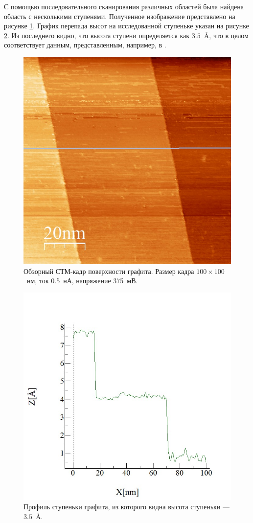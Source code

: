 \documentclass[a4paper, 12pt]{article}
\begin{document}
	С помощью последовательного сканирования различных областей была найдена область с несколькими ступенями. Полученное изображение представлено на рисунке \ref{fig:2_step}. График перепада высот на исследованной ступеньке указан на рисунке \ref{fig:2_step_anal}. Из последнего видно, что высота ступени определяется как $3.5$~\AA, что в целом соответствует данным, представленным, например, в \cite{Article}.
	
	\begin{figure}[H]
		\centering
		\includegraphics[width=0.58\linewidth]{../STM_data/Step/Step_final}
		\caption{Обзорный СТМ-кадр поверхности графита. Размер кадра $100\times100$~нм, ток 0.5~нА, напряжение 375~мВ.}
		\label{fig:2_step}
	\end{figure}
	
	\begin{figure}[H]
		\centering
		\includegraphics[width=0.6\linewidth]{../STM_data/Step/Step_final_Graph_enh.jpg}
		\caption{Профиль ступеньки графита, из которого видна высота ступеньки --- $3.5$~\AA.}
		\label{fig:2_step_anal}
	\end{figure}
	
\end{document}
